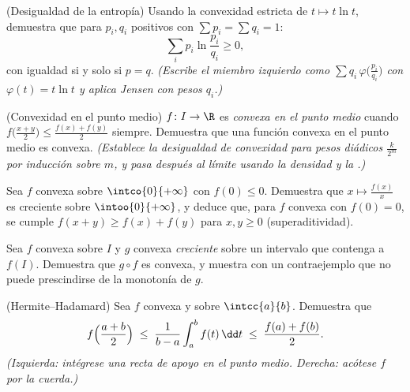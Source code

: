 \begin{exercise}[$\star\star$]\label{exo:b2:realfun:7}
(Desigualdad de la entropía) Usando la convexidad estricta de $t
\mapsto t\ln t$, demuestra que para $p_i, q_i$ positivos con $\sum
p_i = \sum q_i = 1$:
\[
\sum_i p_i \ln\frac{p_i}{q_i} \geq 0 ,
\]
con igualdad si y solo si $p = q$. \emph{(Escribe el miembro
izquierdo como $\sum q_i\, \varphi\bigl(\frac{p_i}{q_i}\bigr)$ con
$\varphi(t) = t\ln t$ y aplica Jensen con pesos $q_i$.)}
\end{exercise}

\begin{exercise}[$\star\star\star$]\label{exo:b2:realfun:8}
(Convexidad en el punto medio) $f \colon I \to \R$ es
\emph{convexa en el punto medio} cuando
$f\bigl(\frac{x+y}{2}\bigr) \leq \frac{f(x) + f(y)}{2}$ siempre.
Demuestra que una función \emph{} convexa en el punto medio
es convexa. \emph{(Establece la desigualdad de convexidad para pesos
diádicos $\frac{k}{2^m}$ por inducción sobre $m$, y pasa después al
límite usando la densidad y la .)}
\end{exercise}

\begin{exercise}[$\star\star\star$]\label{exo:b2:realfun:9}
Sea $f$ convexa sobre $\intco{0}{+\infty}$ con $f(0) \leq 0$.
Demuestra que $x \mapsto \frac{f(x)}{x}$ es creciente sobre
$\intoo{0}{+\infty}$, y deduce que, para $f$ convexa con $f(0) = 0$,
se cumple $f(x + y) \geq f(x) + f(y)$ para $x, y \geq 0$
(superaditividad).
\end{exercise}

\begin{exercise}[$\star$]\label{exo:b2:realfun:10}
Sea $f$ convexa sobre $I$ y $g$ convexa \emph{creciente} sobre un
intervalo que contenga a $f(I)$. Demuestra que $g \circ f$ es
convexa, y muestra con un contraejemplo que no puede prescindirse de
la monotonía de $g$.
\end{exercise}

\begin{exercise}[$\star\star$]\label{exo:b2:realfun:11}
(Hermite--Hadamard) Sea $f$ convexa y  sobre
$\intcc{a}{b}$. Demuestra que
\[
f\Bigl(\frac{a+b}{2}\Bigr) \;\leq\; \frac{1}{b -
a}\int_a^b f(t)\,\dd t \;\leq\; \frac{f(a) + f(b)}{2} .
\]
\emph{(Izquierda: intégrese una recta de apoyo en el punto medio.
Derecha: acótese $f$ por la cuerda.)}
\end{exercise}

